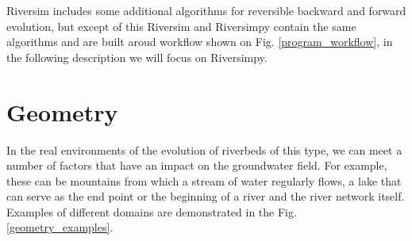 \documentclass[]{pracamgr}
\begin{document}
    Riversim includes some additional algorithms for reversible backward and forward evolution, but except of this Riversim and Riversimpy contain the same algorithms and are built aroud workflow shown on Fig. \ref{program_workflow}, in the following description we will focus on Riversimpy.

    \section{Geometry}
      
      In the real environments of the evolution of riverbeds of this type, we can meet a number of factors that have an impact on the groundwater field. For example, these can be mountains from which a stream of water regularly flows, a lake that can serve as the end point or the beginning of a river and the river network itself. Examples of different domains are demonstrated in the Fig. \ref{geometry_examples}.
      
\end{document}
